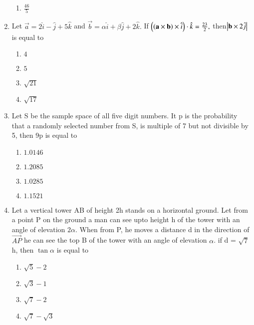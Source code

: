 \documentclass[journal,12pt,twocolumn]{IEEEtran}
\theoremstyle{remark}
\begin{document}
\begin{enumerate}[start=1]
\begin{enumerate}
    \item $\frac{46}{5}$
\end{enumerate}
\item Let $\vec{a} = 2\hat{i}-\hat{j}+5\hat{k}$ and $ \vec{b} = \alpha \hat{i} + \beta \hat{j}+2\hat{k}.$ If $\left(\left(\mathbf{a}\times \mathbf{b}\right) \times \hat{i}\right)\cdot \hat{k}=\frac{23}{2},$ then$ \left\vert\mathbf{b}\times 2\hat{j}\right\vert$ is equal to
\begin{enumerate}
    \item $4$
    \item $5$
    \item $\sqrt{21}$
    \item $\sqrt{17}$
\end{enumerate}
\item Let S be the sample space of all five digit numbers. It p is the probability that a randomly selected number from S, is multiple of 7 but not divisible by 5, then 9p is equal to
\begin{enumerate}
    \item $1.0146$
    \item $1.2085$
    \item $1.0285$
    \item $1.1521$
\end{enumerate}
\item  Let a vertical tower AB of height 2h stands on a horizontal ground. Let from a point P on the ground a man can see upto height h of the tower with an angle of elevation $2\alpha$. When from P, he moves a distance d in the direction of $ \overrightarrow{AP}$ he can see the top B of the tower with an angle of elevation $\alpha$.  if d = $\sqrt{7}$ h, then $\tan \alpha$ is equal to
\begin{enumerate}
    \item $ \sqrt{5}-2$
    \item $ \sqrt{3}-1$
    \item $ \sqrt{7}-2$
    \item $ \sqrt{7}-\sqrt{3}$
\end{enumerate}
\end{enumerate}
\end{document}
